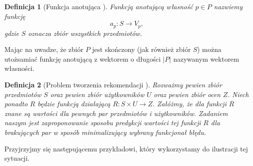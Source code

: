 \documentclass[12pt,a4paper]{report}
\newtheorem{df}{Definicja}[chapter]
\begin{document}
\begin{df}[Funkcja anotująca {\citep[Sec 1.3]{kidzinski}}]
Funkcją anotującą własność $p \in P$ nazwiemy funkcję 
$$
a_p \colon S \to V_p,
$$
gdzie $S$ oznacza zbiór wszystkich przedmiotów.
\end{df}

Mając na uwadze, że zbiór $P$ jest skończony (jak również zbiór $S$) można utożsamiać funkcję anotującą z wektorem o długości $|P|$ nazywanym wektorem własności.

\begin{df}[Problem tworzenia rekomendacji {\citep[Sec 1.3]{kidzinski}}]
Rozważmy pewien zbiór przedmiotów $S$ oraz pewien zbiór użytkowników $U$ oraz pewien zbiór ocen $Z$. Niech ponadto $R$ będzie funkcją działającą $ R: S \times U \to Z$. Załóżmy, że dla funkcji $R$ znane są wartości dla pewnych par przedmiotów i użytkowników. Zadaniem naszym jest zaproponowanie sposobu predykcji wartości tej funkcji $R$ dla brakujących par w sposób minimalizujący wybrany funkcjonał błędu. 
\end{df}

Przyjrzyjmy się następującemu przykładowi, który wykorzystamy do ilustracji tej sytuacji.
\end{document}
